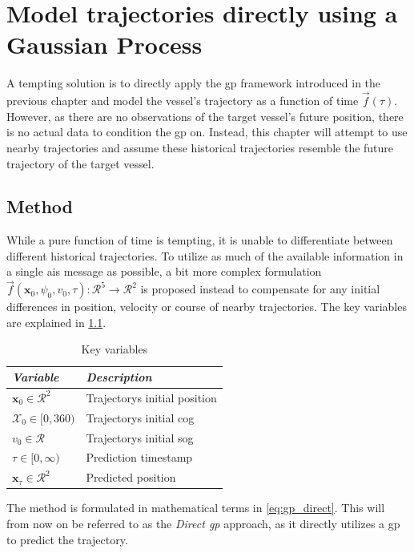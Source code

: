 \chapter{Model trajectories directly using a Gaussian Process}\label{chap:direct_gp}
 A tempting solution is to directly apply the \acrshort{gp} framework introduced in the previous chapter and model the vessel's trajectory as a function of time $\vec{f}(\tau)$. However, as there are no observations of the target vessel's future position, there is no actual data to condition the \acrshort{gp} on. Instead, this chapter will attempt to use nearby trajectories and assume these historical trajectories resemble the future trajectory of the target vessel. 

\section{Method}
While a pure function of time is tempting, it is unable to differentiate between different historical trajectories. To utilize as much of the available information in a single \acrshort{ais} message as possible, a bit more complex formulation $\vec{f}(\boldsymbol{x}_0, \psi_0, v_0, \tau): \mathcal{R}^5 \to \mathcal{R}^2$ is proposed instead to compensate for any initial differences in position, velocity or course of nearby trajectories. The key variables are explained in \cref{table:posgp_key_variables}.

\begin{table}[h]
    \centering
    \begin{tabular}{ll}
        \textit{\textbf{Variable}}              & \textit{\textbf{Description}}      \\ \hline
        $\boldsymbol{x}_0 \in \mathcal{R}^2$    & Trajectorys initial position       \\
        $\mathcal{X}_0 \in [0, 360)$            & Trajectorys initial \acrshort{cog} \\
        $v_0 \in \mathcal{R}$                   & Trajectorys initial \acrshort{sog} \\
        $\tau \in [0, \infty)$                  & Prediction timestamp               \\
        $\boldsymbol{x}_\tau \in \mathcal{R}^2$ & Predicted position                 \\
    \end{tabular}
    \caption{Key variables}
    \label{table:posgp_key_variables}
\end{table}
The method is formulated in mathematical terms in \cref{eq:gp_direct}. This will from now on be referred to as the \textit{Direct \acrshort{gp}} approach, as it directly utilizes a \acrshort{gp} to predict the trajectory.


